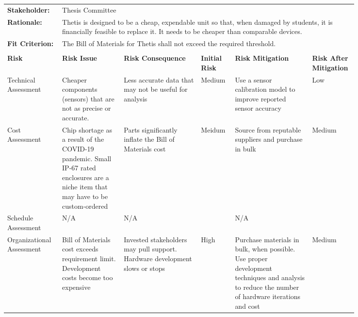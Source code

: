 \begin{landscape}
{\begin{longtable}{| p{0.12\linewidth} | p{0.16\linewidth} |  p{0.20\linewidth} | p{0.08\linewidth} | p{0.20\linewidth} | p{0.08\linewidth} |}
	\hline
	\rowcolor[gray]{0.8}
	\multicolumn{6}{|c|}{ } \\
	\hline
	\textbf{Stakeholder:} & \multicolumn{5}{|l|}{Thesis Committee} \\
	\hline
	\textbf{Rationale:} & \multicolumn{5}{|p{0.8\linewidth}|}{Thetis is designed to be a cheap, expendable unit so that, when damaged by students, it is financially feasible to replace it. It needs to be cheaper than comparable devices.} \\
	\hline
	\textbf{Fit Criterion:} & \multicolumn{5}{|p{0.8\linewidth}|}{The Bill of Materials for Thetis shall not exceed the required threshold.} \\
	\hline
	\rowcolor[gray]{0.8}
	\multicolumn{6}{|c|}{ } \\
	\hline
	\textbf{Risk} & \textbf{Risk Issue} & \textbf{Risk Consequence} & \textbf{Initial Risk} & \textbf{Risk Mitigation} & \textbf{Risk \newline After \newline Mitigation} \\
	\hline
	Technical \newline Assessment & Cheaper components (sensors) that are not as precise or accurate. & Less accurate data that may not be useful for analysis & \cellcolor{yellow} Medium & Use a sensor calibration model to improve reported sensor accuracy & \cellcolor{green} Low \\
	\hline
	Cost \newline Assessment & Chip shortage as a result of the COVID-19 pandemic. \newline Small IP-67 rated enclosures are a niche item that may have to be custom-ordered & Parts significantly inflate the Bill of Materials cost & \cellcolor{yellow} Meidum & Source from reputable suppliers and purchase in bulk & \cellcolor{yellow} Medium \\
	\hline
	Schedule \newline Assessment & N/A & N/A & \cellcolor[gray]{0.8} & N/A & \cellcolor[gray]{0.8} \\
	\hline
	Organizational \newline Assessment & Bill of Materials cost exceeds requirement limit. \newline Development costs become too expensive & Invested stakeholders may pull support. \newline Hardware development slows or stops & \cellcolor{red} High & Purchase materials in bulk, when possible. \newline Use proper development techniques and analysis to reduce the number of hardware iterations and cost  & \cellcolor{yellow} Medium \\

\end{longtable}}
\end{landscape}
